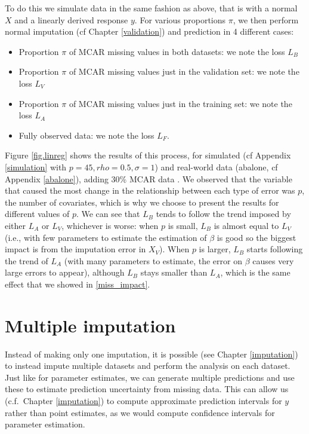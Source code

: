 To do this we simulate data in the same fashion as above, that is with a normal $X$ and a linearly derived response $y$. For various proportions $\pi$, we then perform normal imputation (cf Chapter \ref{validation}) and prediction in 4 different cases:
\begin{itemize}
\item Proportion $\pi$ of MCAR missing values in both datasets: we note the loss $L_B$
\item Proportion $\pi$ of MCAR missing values just in the validation set: we note the loss $L_V$
\item Proportion $\pi$ of MCAR missing values just in the training set: we note the loss $L_A$
\item Fully observed data: we note the loss $L_F$.
\end{itemize}

Figure \ref{fig.linreg} shows the results of this process, for simulated (cf Appendix \ref{simulation} with $p=45, rho=0.5, \sigma=1$) and real-world data (abalone, cf Appendix \ref{abalone}), adding 30\% MCAR data . We observed that the variable that caused the most change in the relationship between each type of error was $p$, the number of covariates, which is why we choose to present the results for different values of $p$. We can see that $L_B$ tends to follow the trend imposed by either $L_A$ or $L_V$, whichever is worse: when $p$ is small, $L_B$ is almost equal to $L_V$ (i.e., with few parameters to estimate the estimation of $\beta$ is good so the biggest impact is from the imputation error in $X_V$). When $p$ is larger, $L_B$ starts following the trend of $L_A$ (with many parameters to estimate, the error on $\beta$ causes very large errors to appear), although $L_B$ stays smaller than $L_A$, which is the same effect that we showed in \ref{miss_impact}.




	\section{Multiple imputation}
Instead of making only one imputation, it is possible (see Chapter \ref{imputation}) to instead impute multiple datasets and perform the analysis on each dataset. Just like for parameter estimates, we can generate multiple predictions and use these to estimate prediction uncertainty from missing data. This can allow us (c.f.\ Chapter \ref{imputation}) to compute approximate prediction intervals for $y$ rather than point estimates, as we would compute confidence intervals for parameter estimation.


